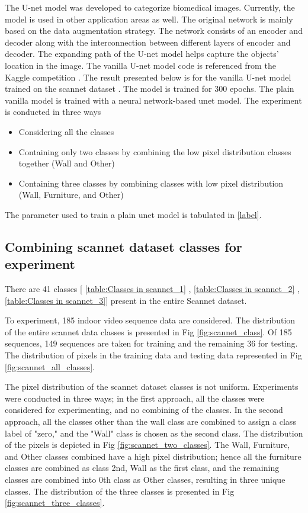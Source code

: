     The U-net model was developed to categorize biomedical images. Currently, the model is used in other application areas as well. The original network is mainly based on the data augmentation strategy. The network consists of an encoder and decoder along with the interconnection between different layers of encoder and decoder. The expanding path of the U-net model helps capture the objects' location in the image. The vanilla U-net model code is referenced from the Kaggle competition \cite{85_kag_challenge}. The result presented below is for the vanilla U-net model trained on the scannet dataset \cite{79_dai2017scannet}. The model is trained for 300 epochs. The plain vanilla model is trained with a neural network-based unet model. The experiment is conducted in three ways
    \begin{itemize}
    	\item Considering all the classes
    	\item Containing only two classes by combining the low pixel distribution classes together (Wall and Other)
    	\item Containing three classes by combining classes with low pixel distribution (Wall, Furniture, and Other)
    \end{itemize}
    
    
    The parameter used to train a plain unet model is tabulated in \ref{label}.
    
    \subsection{Combining scannet dataset classes for experiment}
    
	There are 41 classes [ \ref{table:Classes in scannet_1} , \ref{table:Classes in scannet_2} , \ref{table:Classes in scannet_3}] present in the entire Scannet dataset. 

	To experiment, 185 indoor video sequence data are considered. The distribution of the entire scannet data classes is presented in Fig \ref{fig:scannet_class}. Of 185 sequences, 149 sequences are taken for training and the remaining 36 for testing. The distribution of pixels in the training data and testing data represented in Fig \ref{fig:scannet_all_classes}.
	
	The pixel distribution of the scannet dataset classes is not uniform. Experiments were conducted in three ways; in the first approach, all the classes were considered for experimenting, and no combining of the classes. In the second approach, all the classes other than the wall class are combined to assign a class label of "zero," and the "Wall" class is chosen as the second class. The distribution of the pixels is depicted in Fig \ref{fig:scannet_two_classes}.
	The Wall, Furniture, and Other classes combined have a high pixel distribution; hence all the furniture classes are combined as class 2nd, Wall as the first class, and the remaining classes are combined into 0th class as Other classes, resulting in three unique classes. The distribution of the three classes is presented in Fig \ref{fig:scannet_three_classes}.
    
